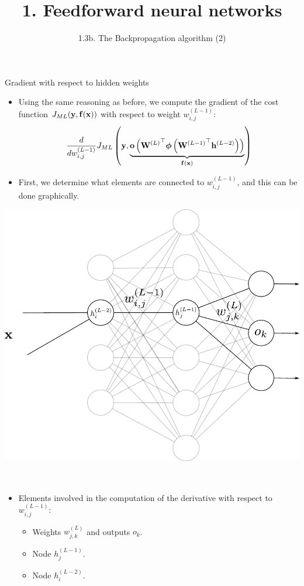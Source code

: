 \documentclass{beamer}
\title{1. Feedforward neural networks}
\subtitle{1.3b. The Backpropagation algorithm (2)}
\begin{document}
\maketitle

\begin{frame}{Gradient  with respect to hidden  weights}

\begin{itemize}
\item Using the same reasoning as before, we compute the gradient of the cost function $J_{ML}({\bf y},{\bf f}({\bf x}))$ with respect to weight $w^{(L-1)}_{i,j}$:
\begin{equation}
    \frac{d}{dw_{i,j}^{(L-1)}} J_{ML}\left(
    {\bf y},\underbrace{{\bf o}\left({{\bf W}^{(L)}}^\top\boldsymbol{\mathit{\phi}}\left({{\bf W}^{(L-1)}}^\top{\bf h}^{(L-2)}\right)\right)}_{{\bf f}({\bf x})}
    \right)
\end{equation}
\item First, we determine what elements are connected to $w_{i,j}^{(L-1)}$, and this can be done graphically.

\end{itemize}
\end{frame}
\begin{frame}
\begin{multicols}{2}
\begin{center}
    \includegraphics[scale=0.32]{Module 1 (NN)/pics/backprop.pdf}
    \end{center}
    
\columnbreak
~\\
\begin{itemize}
\item Elements involved in the computation of the derivative with respect to $w_{i,j}^{(L-1)}$:
\begin{itemize}
\item Weights $w_{j,k}^{(L)}$ and outputs $o_k$.
\item Node $h_j^{(L-1)}$.
\item Node $h_i^{(L-2)}$.
\end{itemize}
\end{itemize}
\end{multicols}
\end{frame}
\end{document}
